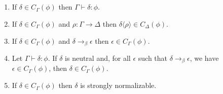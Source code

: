 \begin{code}%
\> \AgdaSymbol{:}  \AgdaSymbol{\{}\AgdaSymbol{\}}           \<%
\\
\>  \AgdaSymbol{(}  \AgdaSymbol{)}  \AgdaSymbol{=}        \<%
\\
\>  \AgdaSymbol{(}  \AgdaSymbol{(} \AgdaInductiveConstructor{,,}  \AgdaInductiveConstructor{,,} \AgdaSymbol{))}  \AgdaSymbol{=}     \AgdaSymbol{(}  \AgdaSymbol{)}     \<[63]%
\>[63]\<%
\\
\>[0]\<[2]%
\>[2]  \AgdaSymbol{\{} \AgdaSymbol{:}  \AgdaSymbol{\}}          \<[42]%
\>[42]\<%
\\
\>[2]\<[4]%
\>[4]        \AgdaSymbol{(} \AgdaSymbol{(}   \AgdaSymbol{)} \AgdaSymbol{))}\<%
\end{code}

\begin{lemma}$ $
\begin{enumerate}
\item
If $\delta \in C_\Gamma(\phi)$ then $\Gamma \vdash \delta : \phi$.
\item
If $\delta \in C_\Gamma(\phi)$ and $\rho : \Gamma \rightarrow \Delta$ then $\delta \langle \rho \rangle \in C_\Delta(\phi)$.
\item
If $\delta \in C_\Gamma(\phi)$ and $\delta \rightarrow_\beta \epsilon$ then $\epsilon \in C_\Gamma(\phi)$.
\item
Let $\Gamma \vdash \delta : \phi$.  
If $\delta$ is neutral and, for all $\epsilon$ such that $\delta \rightarrow_\beta \epsilon$, we have $\epsilon \in C_\Gamma(\phi)$, then $\delta \in C_\Gamma(\phi)$.
\item
If $\delta \in C_\Gamma(\phi)$ then $\delta$ is strongly normalizable.
\end{enumerate}
\end{lemma}

